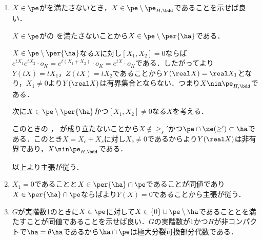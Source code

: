 \begin{npfwn}
  \leavevmode\vspace{-1em}
  \begin{enumerate}[label=\textbf{\arabic*.}]
    
  \item $X\in \pe$がを満たさないとき，$X\in \pe\setminus\pe_{H,\bdd} $であることを示せば良い．
    
    $X\in \pe$がの  を満たさないことから$X\in\pe\setminus\per{\ha} $である．

    $X\in \pe\setminus\per{\ha} $なる$X$に対し$[X_1,X_2] = 0$ならば$e^{tX_1}e^{tX_2}\cdot o_K = e^{t(X_1 + X_2)}\cdot o_K = e^{tX}\cdot o_K$である．したがってより$Y(tX) = tX_1 $，$Z(tX) = tX_2 $であることから$Y(\real X) = \real X_1 $となり，$X_1\neq 0$より$Y(\real X)$は有界集合とならない．つまり$X\nin\pe_{H,\bdd} $である．

    次に$X\in \pe\setminus \per{\ha} $かつ$[X_1,X_2] \neq 0$なる$X$を考える．

    このときの ， が成り立たないことから$X\nin \ge_{s}' $かつ$\pe\cap \ze(\ge')\subset \ha $である．このとき$X = X_c + X_s $に対し$X_c\neq 0$であるからより$Y(\real X)$は非有界であり，$X\nin\pe_{H,\bdd} $である．


    以上より主張が従う．
  \item $X_1 = 0$であることと$ X\in \per{\ha}\cap\pe $であることが同値であり$X\in \per{\ha}\cap\pe $ならばより$Y(X) = 0 $であることから主張が従う．
  \item $G$が実階数1のときに$X\in \pe$に対して$X\in \{0\}\cup \pe\setminus \ha $であることとを満たすことが同値であることを示せば良い．$G$の実階数が1かつ$H$が非コンパクトで$\ha = \theta\ha$であるから$\ha\cap\pe$は極大分裂可換部分代数である．


\end{enumerate}
\end{npfwn}
